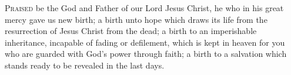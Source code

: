 \lettrine[lines=3,loversize=0.15]{P}{raised} be the God and Father of our Lord Jesus Christ, he who in his great mercy gave us new birth; a birth unto hope which draws its life from the resurrection of Jesus Christ from the dead; a birth to an imperishable inheritance, incapable of fading or defilement, which is kept in heaven for you who are guarded with God’s power through faith; a birth to a salvation which stands ready to be revealed in the last days.
